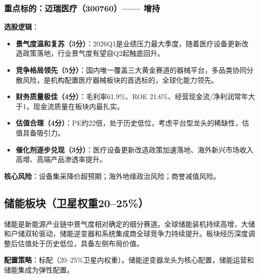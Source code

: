 \subsubsection*{重点标的：迈瑞医疗（300760）—— 增持}

\textbf{选股逻辑}：
\vspace{0.2em}
\begin{itemize}[leftmargin=2em]
\item \textbf{景气度温和复苏（3分）}：2026Q1是业绩压力最大季度，随着医疗设备更新改造政策落地，行业景气度有望自Q2起触底回升。
\item \textbf{竞争格局领先（5分）}：国内唯一覆盖三大黄金赛道的器械平台，多品类协同分散风险，是机构配置医疗器械板块的首选标的，全球化能力领先。
\item \textbf{财务质量极佳（4分）}：毛利率61.9\%、ROE 21.6\%、经营现金流/净利润常年大于1，现金流质量在板块内最扎实。
\item \textbf{估值合理（4分）}：PE约22倍，处于历史低位，考虑平台型龙头的稀缺性，估值具备吸引力。
\item \textbf{催化剂逐步兑现（3分）}：医疗设备更新改造政策加速落地、海外新兴市场收入高增、高端产品渗透率提升。
\end{itemize}

\textbf{核心风险}：设备集采降价超预期；海外地缘政治风险；商誉减值风险。

\subsection{储能板块（卫星权重20--25\%）}

储能是新能源产业链中景气度相对确定的细分赛道。全球储能装机持续高增，大储和户储双轮驱动，储能逆变器和系统集成商全球竞争力持续提升。板块经历深度调整后估值处于历史低位，具备左侧布局价值。

\textbf{配置策略}：标配（20--25\%卫星内权重）。储能逆变器龙头为核心配置，储能运营和储能集成为弹性配置。

